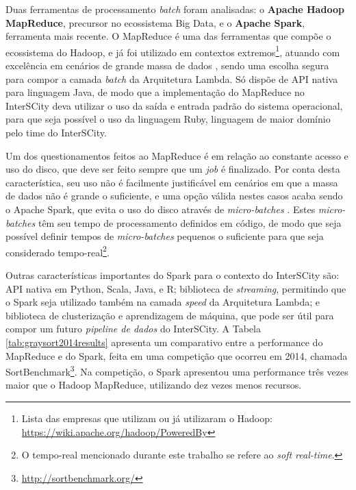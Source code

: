 Duas ferramentas de processamento \textit{batch} foram analisadas: o
\textbf{Apache Hadoop MapReduce}, precursor no ecossistema Big Data, e o
\textbf{Apache Spark}, ferramenta mais recente. O MapReduce é uma das
ferramentas que compõe o ecossistema do Hadoop, e já foi utilizado em contextos
extremos\footnote{Lista das empresas que utilizam ou já
utilizaram o Hadoop: \url{https://wiki.apache.org/hadoop/PoweredBy}}, atuando
com excelência em cenários de grande massa de dados \cite{zaharia2008}, sendo
uma escolha segura para compor a camada \textit{batch} da Arquitetura
Lambda. Só dispõe de API nativa para linguagem Java, de modo que a
implementação do MapReduce no InterSCity deva utilizar o uso da saída e entrada
padrão do sistema operacional, para que seja possível o uso da linguagem Ruby,
linguagem de maior domínio pelo time do InterSCity.

Um dos questionamentos feitos ao MapReduce é em relação ao constante acesso e
uso do disco, que deve ser feito sempre que um \textit{job} é finalizado. Por
conta desta característica, seu uso não é facilmente justificável em cenários em
que a massa de dados não é grande o suficiente, e uma opção válida nestes casos
acaba sendo o Apache Spark, que evita o uso do disco através de
\textit{micro-batches} \cite{arsalan2014}. Estes \textit{micro-batches} têm seu
tempo de processamento definidos em código, de modo que seja possível definir
tempos de \textit{micro-batches} pequenos o suficiente para que seja considerado
tempo-real\footnote{O tempo-real mencionado durante este trabalho se refere ao
\textit{soft real-time}.}.

Outras características importantes do Spark para o contexto do
InterSCity são: API nativa em Python, Scala, Java, e R; biblioteca de
\textit{streaming}, permitindo que o Spark seja utilizado também na camada
\textit{speed} da Arquitetura Lambda; e biblioteca de clusterização e
aprendizagem de máquina, que pode ser útil para compor um futuro \textit{pipeline
de dados} do InterSCity. A Tabela \ref{tab:graysort2014results} apresenta
um comparativo entre a performance do MapReduce e do Spark, feita em uma
competição que ocorreu em 2014, chamada
SortBenchmark\footnote{\url{http://sortbenchmark.org/}}. Na competição, o Spark
apresentou uma performance três vezes maior que o Hadoop MapReduce, utilizando
dez vezes menos recursos.


